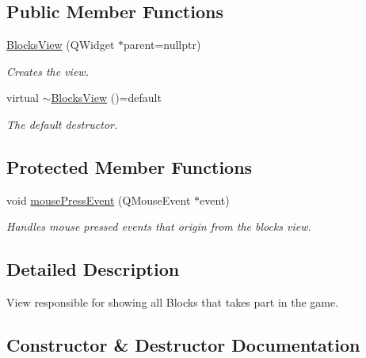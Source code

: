 \subsection*{Public Member Functions}
\begin{DoxyCompactItemize}
\item 
\mbox{\hyperlink{class_blocks_view_a921e08c8ceb03226654cdedca68590ad}{Blocks\+View}} (Q\+Widget $\ast$parent=nullptr)
\begin{DoxyCompactList}\small\item\em Creates the view. \end{DoxyCompactList}\item 
virtual \mbox{\hyperlink{class_blocks_view_a40c2c572d4a1cb2809ce55fa0746c4ff}{$\sim$\+Blocks\+View}} ()=default
\begin{DoxyCompactList}\small\item\em The default destructor. \end{DoxyCompactList}\end{DoxyCompactItemize}
\subsection*{Protected Member Functions}
\begin{DoxyCompactItemize}
\item 
void \mbox{\hyperlink{class_blocks_view_a9131c975ebe8b9c6933890bb9d9b0848}{mouse\+Press\+Event}} (Q\+Mouse\+Event $\ast$event)
\begin{DoxyCompactList}\small\item\em Handles mouse pressed events that origin from the blocks view. \end{DoxyCompactList}\end{DoxyCompactItemize}


\subsection{Detailed Description}
View responsible for showing all Blocks that takes part in the game. 



\subsection{Constructor \& Destructor Documentation}
\mbox{\label{class_blocks_view_a921e08c8ceb03226654cdedca68590ad}} 
